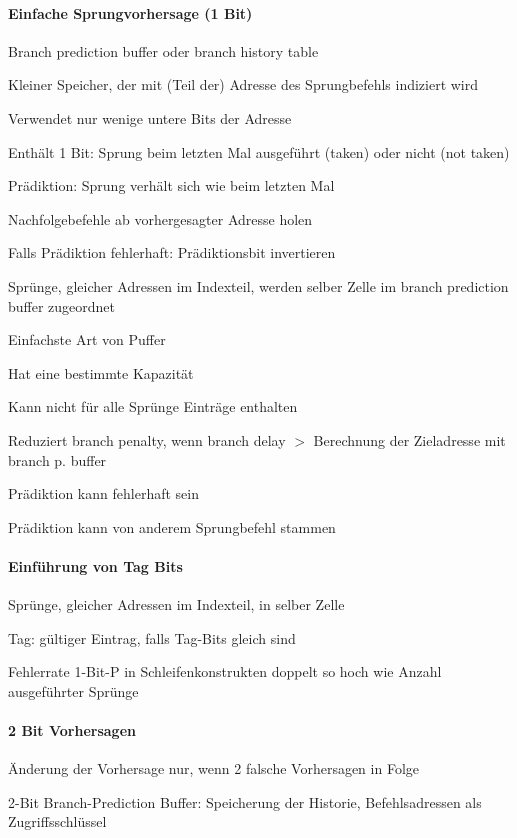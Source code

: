 \documentclass[a4paper]{article}
\begin{document}
\begin{multicols}{3}
  \paragraph{Einfache Sprungvorhersage (1 Bit)}
  \begin{itemize*}
    \item Branch prediction buffer oder branch history table
    \item Kleiner Speicher, der mit (Teil der) Adresse des Sprungbefehls indiziert wird
    \item Verwendet nur wenige untere Bits der Adresse
    \item Enthält 1 Bit: Sprung beim letzten Mal ausgeführt (taken) oder nicht (not taken)
    \item Prädiktion: Sprung verhält sich wie beim letzten Mal
    \item Nachfolgebefehle ab vorhergesagter Adresse holen
    \item Falls Prädiktion fehlerhaft: Prädiktionsbit invertieren
    \item Sprünge, gleicher Adressen im Indexteil, werden selber Zelle im branch prediction buffer zugeordnet
    \item Einfachste Art von Puffer
    \item Hat eine bestimmte Kapazität
    \item Kann nicht für alle Sprünge Einträge enthalten
    \item Reduziert branch penalty, wenn branch delay $>$ Berechnung der Zieladresse mit branch p. buffer
    \item Prädiktion kann fehlerhaft sein
    \item Prädiktion kann von anderem Sprungbefehl stammen
  \end{itemize*}
  
  \paragraph{Einführung von Tag Bits}
  \begin{itemize*}
    \item Sprünge, gleicher Adressen im Indexteil, in selber Zelle
    \item Tag: gültiger Eintrag, falls Tag-Bits gleich sind
    \item Fehlerrate 1-Bit-P in Schleifenkonstrukten doppelt so hoch wie Anzahl ausgeführter Sprünge
  \end{itemize*}
  
  \paragraph{2 Bit Vorhersagen}
  \begin{itemize*}
    \item Änderung der Vorhersage nur, wenn 2 falsche Vorhersagen in Folge
    \item 2-Bit Branch-Prediction Buffer: Speicherung der Historie, Befehlsadressen als Zugriffsschlüssel
  \end{itemize*}
  

\end{multicols}
\end{document}
